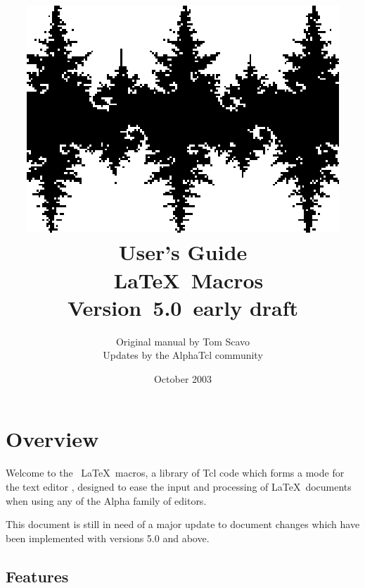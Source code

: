 \documentclass{report}
\begin{document}
\title{
	\includegraphics{logo.eps}  \\[6ex]
	User's Guide  \\
	\Alpha\ \LaTeX\ Macros \\
	{\large Version~5.0~early draft}
}
\author{
	Original manual by Tom Scavo \\
        Updates by the AlphaTcl community
}
\date{October 2003}
\maketitle

\tableofcontents

\chapter{Overview}

Welcome to the \Alpha\ \LaTeX\ macros, a library of Tcl code which
forms a mode for the text editor \Alpha, designed to ease the input and
processing of \LaTeX\ documents when using any of the Alpha family of
editors.

This document is still in need of a major update to document changes 
which have been implemented with versions 5.0 and above.

\section{Features}
\end{document}
